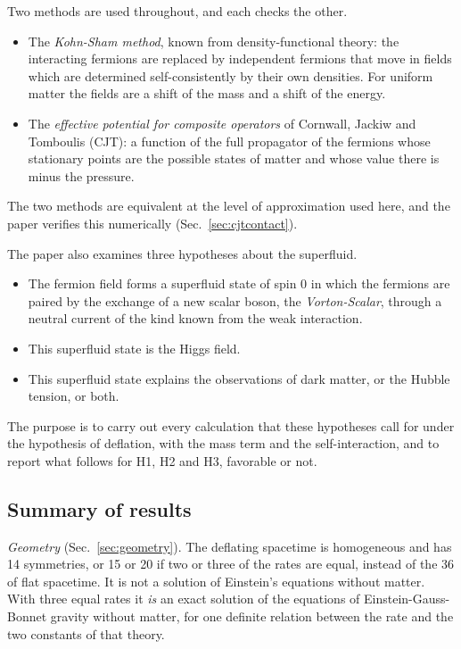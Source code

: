 Two methods are used throughout, and each checks the other.
\begin{itemize}
\item The \emph{Kohn-Sham method}, known from density-functional theory: the interacting fermions
are replaced by independent fermions that move in fields which are determined self-consistently by
their own densities. For uniform matter the fields are a shift of the mass and a shift of the
energy.
\item The \emph{effective potential for composite operators} of Cornwall, Jackiw and Tomboulis
(CJT): a function of the full propagator of the fermions whose stationary points are the possible
states of matter and whose value there is minus the pressure.
\end{itemize}
The two methods are equivalent at the level of approximation used here, and the paper verifies this
numerically (Sec.~\ref{sec:cjtcontact}).

The paper also examines three hypotheses about the superfluid.
\begin{itemize}
\item[H1.] The fermion field forms a superfluid state of spin 0 in which the fermions are paired by
the exchange of a new scalar boson, the \emph{Vorton-Scalar}, through a neutral current of the kind
known from the weak interaction.
\item[H2.] This superfluid state is the Higgs field.
\item[H3.] This superfluid state explains the observations of dark matter, or the Hubble tension, or
both.
\end{itemize}
The purpose is to carry out every calculation that these hypotheses call for under the hypothesis of
deflation, with the mass term and the self-interaction, and to report what follows for H1, H2 and
H3, favorable or not.

\subsection{Summary of results}

\emph{Geometry} (Sec.~\ref{sec:geometry}). The deflating spacetime is homogeneous and has 14
symmetries, or 15 or 20 if two or three of the rates are equal, instead of the 36 of flat spacetime.
It is not a solution of Einstein's equations without matter. With three equal rates it \emph{is} an
exact solution of the equations of Einstein-Gauss-Bonnet gravity without matter, for one definite
relation between the rate and the two constants of that theory.

